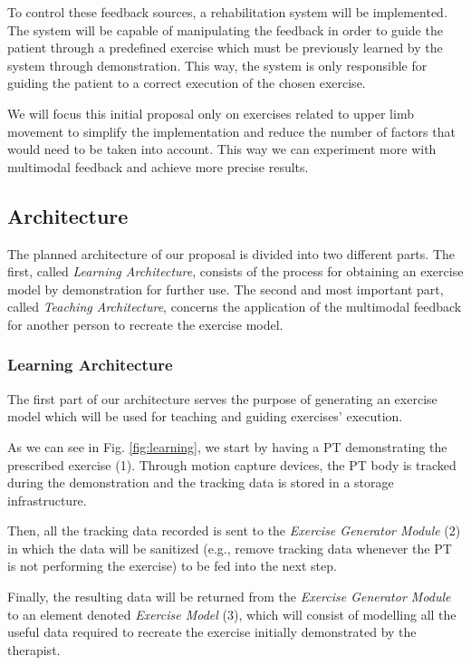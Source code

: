 To control these feedback sources, a rehabilitation system will be implemented.%
The system will be capable of manipulating the feedback in order to guide
the patient through a predefined exercise which must be previously learned by the system through demonstration.
This way, the system is only responsible for guiding the patient to a correct execution of the chosen exercise.

We will focus this initial proposal only on exercises related to upper limb movement to simplify the implementation and reduce the number of factors that would need to be taken into account. This way we can experiment more with multimodal feedback and achieve more precise results.


\subsection{Architecture}
\label{section-approach-architecture}

The planned architecture of our proposal is divided into two different parts. 
The first, called \emph{Learning Architecture}, consists of the process for obtaining an exercise model by demonstration for further use.
The second and most important part, called \emph{Teaching Architecture}, concerns the application of the multimodal feedback for another person to recreate the exercise model.


\subsubsection{Learning Architecture}

The first part of our architecture serves the purpose of generating an exercise model which will be used for teaching and guiding exercises' execution.

As we can see in Fig. \ref{fig:learning}, we start by having a \ac{PT} demonstrating the prescribed exercise (1). Through motion capture devices, the \ac{PT} body is tracked during the demonstration and the tracking data is stored in a storage infrastructure.

Then, all the tracking data recorded is sent to the \emph{Exercise Generator Module} (2) in which the data will be sanitized (e.g., remove tracking data whenever the \ac{PT} is not performing the exercise) to be fed into the next step.

Finally, the resulting data will be returned from the \emph{Exercise Generator Module} to an element denoted \emph{Exercise Model} (3), which will consist of modelling all the useful data required to recreate the exercise initially demonstrated by the therapist. 

